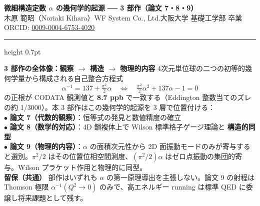 \documentclass[9pt,a4paper]{ltjsarticle}
\begin{document}
\begin{center}
{\Large\bfseries 微細構造定数 $\alpha$ の幾何学的起源 ── 3 部作（論文 7・8・9）}\\[2pt]
{\small 木原 範昭（Noriaki Kihara）\enspace WF System Co., Ltd.\enspace 大阪大学 基礎工学部 卒業\enspace ORCID: \href{https://orcid.org/0009-0004-6753-4020}{0009-0004-6753-4020}}
\end{center}

\vspace{-1pt}
\hrule height 0.7pt
\vspace{4pt}

\begin{tcolorbox}[colback=gray!7,colframe=gray!55,boxrule=0.4pt,arc=2pt,left=4pt,right=4pt,top=2pt,bottom=2pt]
{\small
\textbf{3 部作の全体像：観察 $\to$ 構造 $\to$ 物理的内容}\enspace
4次元単位球の二つの初等的幾何学量から構成される自己整合方程式
\[ \alpha^{-1} = 137 + \tfrac{\pi^2}{2}\alpha \quad\Longleftrightarrow\quad \tfrac{\pi^2}{2}\alpha^2 + 137\alpha - 1 = 0 \]
の正根が CODATA 観測値と \textbf{8.7 ppb} で一致する（Eddington 整数当てのズレの約 1/3000）。本 3 部作はこの幾何学的起源を 3 層で位置付ける：\\[1pt]
$\bullet$ \textbf{論文 7（代数的観察）}：恒等式の発見と数値精度の確立\\
$\bullet$ \textbf{論文 8（数学的対応）}：4D 鎖複体上で Wilson 標準格子ゲージ理論と \textbf{構造的同型}\\
$\bullet$ \textbf{論文 9（物理的内容）}：$\alpha$ の面積次元性から 2D 面振動モードのみが寄与すると選別。$\pi^2/2$ はその位置位相空間測度、$(\pi^2/2)\alpha$ はゼロ点振動の集団的寄与。Wilson プラケット作用と物理的に同型。\\[1pt]
\textbf{留保（共通）} 部作はいずれも $\alpha$ の第一原理導出を主張しない。論文 9 の射程は Thomson 極限 $\alpha^{-1}(Q^2 \to 0)$ のみで、高エネルギー running は標準 QED に委譲し将来課題として残す。}
\end{tcolorbox}

\vspace{2pt}
\end{document}
